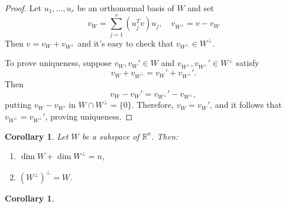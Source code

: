 \documentclass[12pt]{amsart}
\newtheorem{corollary}[theorem]{Corollary}
\theoremstyle{definition}
\theoremstyle{remark}
\numberwithin{equation}{section}
\newcommand{\RR}{\mathbb{R}}
\begin{document}
\begin{proof}
    Let $u_1,\ldots,u_r$ be an orthonormal basis of $W$ and set
    \[
        v_W = \sum_{j=1}^r(u_j^Tv)u_j,\quad v_{W^\perp} = v-v_W
    \]
    Then $v=v_W + v_{W^\perp}$ and it's easy to check
    that $v_{W^\perp}\in W^\perp$. 

    To prove uniqueness, suppose $v_W,v_W'\in W$ and
    $v_{W^\perp},v_{W^\perp}'\in W^\perp$ satisfy
    \[
        v_W + v_{W^\perp} = v_W' + v_{W^\perp}'.
    \]
    Then
    \[
        v_W - v_W' = v_{W^\perp}' - v_{W^\perp},
    \]
    putting $v_W - v_{W'}$ in $W\cap W^\perp=\{0\}$. Therefore, $v_W = v_W'$,
    and it follows that $v_{W^\perp} = v_{W^\perp}'$, proving uniqueness.
\end{proof}

\begin{corollary}
    Let $W$ be a subspace of $\RR^n$. Then:
    \begin{enumerate}
        \item $\dim W + \dim W^\perp = n$,
        \item $(W^\perp)^\perp = W$.
    \end{enumerate}
\end{corollary}

\begin{corollary}
    
\end{corollary}
\end{document}
